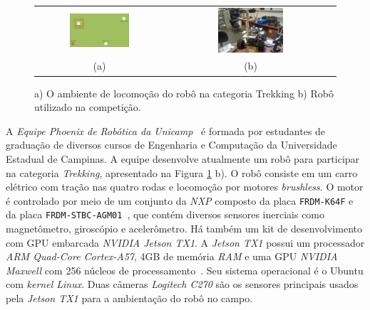 \documentclass[11pt]{article}
\newcommand{\tit}[1]{\textit{#1}}
\newcommand{\ttt}[1]{\texttt{#1}}
\begin{document}
\begin{figure}[hbt]
\begin{center}
		\begin{tabular} {cc}
		\includegraphics[width=0.49\textwidth]{imgs/trekking_campo.png} &
		\includegraphics[width=0.4\textwidth]{imgs/piranha.jpg} \\
		(a) & (b) \\
		\end{tabular}
\end{center}
\caption{a) O ambiente de locomoção do robô na categoria Trekking 
	b) Robô utilizado na competição.}
\label{fig:ambiente}
\end{figure}

A \emph{Equipe Phoenix de Robótica da Unicamp}~\cite{phoenix} 
é formada por estudantes de graduação de diversos cursos de 
Engenharia e Computação da Universidade Estadual de Campinas. 
A equipe desenvolve atualmente um robô para participar na categoria 
\tit{Trekking}, apresentado na Figura \ref{fig:ambiente} b).
O robô consiste em um carro elétrico com tração nas quatro rodas e 
locomoção por motores \tit{brushless}.
O motor é controlado por meio de um conjunto da \tit{NXP} composto da placa
\ttt{FRDM-K64F} e da placa \ttt{FRDM-STBC-AGM01}~\cite{nxp}, que contém 
diversos sensores inerciais como magnetômetro, giroscópio e acelerômetro.
Há também um kit de desenvolvimento com GPU embarcada \tit{NVIDIA Jetson TX1}. 
A \tit{Jetson TX1} possui um processador \tit{ARM Quad-Core Cortex-A57},
4GB de memória \tit{RAM} e uma GPU \tit{NVIDIA Maxwell} com 256 núcleos de
processamento~\cite{tx1}. 
Seu sistema operacional é o Ubuntu com \tit{kernel Linux}.
Duas câmeras \tit{Logitech C270} são os sensores
principais usados pela \tit{Jetson TX1} para a ambientação do robô no campo.
\end{document}
